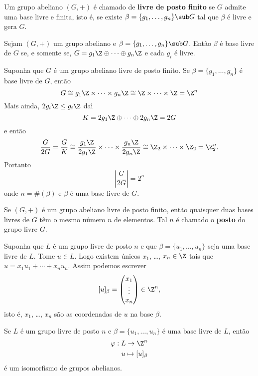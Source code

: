 \begin{definicao}
	Um grupo abeliano $(G, +)$ \'e chamado de \textbf{livre de posto finito} se $G$ admite uma base livre e finita, isto \'e, se existe $\beta = \{g_1, \dots, g_n\} \sub G$ tal que $\beta$ \'e livre e gera $G$.
\end{definicao}

\begin{lema}
	Sejam $(G, +)$ um grupo abeliano e $\beta = \{g_1,\dots, g_n\} \sub G$. Ent\~ao $\beta$ \'e base livre de $G$ se, e somente se, $G = g_1\Z \oplus \cdots \oplus g_n\Z$ e cada $g_i$ \'e livre.
\end{lema}


\begin{observacao}
	Suponha que $G$ \'e um grupo abeliano livre de posto finito. Se $\beta = \{g_1, \dots, g_n\}$ \'e base livre de $G$, ent\~ao
	\[
		G \cong g_1\Z \times \cdots \times g_n\Z \cong \Z \times \cdots \times \Z = \Z^n
	\]
	Mais ainda, $2g_i\Z \le g_i\Z$ da{\'\i}
	\[
		K = 2g_1\Z \oplus \cdots \oplus 2g_n\Z = 2G
	\]
	e ent\~ao
	\[
		\dfrac{G}{2G} = \dfrac{G}{K} \cong \dfrac{g_1\Z}{2g_1\Z} \times \cdots \times \dfrac{g_n\Z}{2g_n\Z} \cong \Z_2 \times \cdots \times \Z_2 = \Z_2^n.
	\]
	Portanto
	\[
		\left|\dfrac{G}{2G}\right| = 2^n
	\]
	onde $n = \#(\beta)$ e $\beta$ \'e uma base livre de $G$.
\end{observacao}

\begin{proposicao}
	Se $(G, +)$ \'e um grupo abeliano livre de posto finito, ent\~ao quaisquer duas bases livres de $G$ t\^em o mesmo n\'umero $n$ de elementos. Tal $n$ \'e chamado o \textbf{posto} do grupo livre $G$.
\end{proposicao}

Suponha que $L$ \'e um grupo livre de posto $n$ e que $\beta = \{u_1, \dots, u_n\}$ seja uma base livre de $L$. Tome $u \in L$. Logo existem \'unicos $x_1$, \dots, $x_n \in \Z$ tais que $u = x_1u_1 + \cdots + x_nu_n$. Assim podemos escrever
\[
	[u]_\beta = \begin{pmatrix}
		x_1\\
		\vdots\\
		x_n
	\end{pmatrix} \in \Z^n,
\]
isto \'e, $x_1$, \dots, $x_n$ s\~ao as coordenadas de $u$ na base $\beta$.

\begin{proposicao}
	Se $L$ \'e um grupo livre de posto $n$ e $\beta = \{u_1,\dots,u_n\}$ \'e uma base livre de $L$, ent\~ao
	\begin{align*}
		\varphi: L \to \Z^n\\
		u \mapsto [u]_\beta
	\end{align*}
	\'e um isomorfismo de grupos abelianos.
\end{proposicao}

